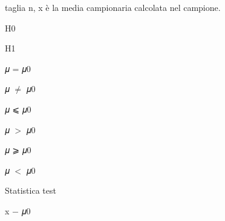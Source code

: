 \documentclass[a4paper,portrait,12pt]{article}
\begin{document}
\begin{flushleft}
taglia n, x \`{e} la media campionaria calcolata nel campione.
\end{flushleft}





\begin{flushleft}
H0
\end{flushleft}





\begin{flushleft}
H1
\end{flushleft}





\begin{flushleft}
𝜇 = 𝜇0
\end{flushleft}





\begin{flushleft}
𝜇 $\neq$ 𝜇0
\end{flushleft}





\begin{flushleft}
𝜇 ⩽ 𝜇0
\end{flushleft}





\begin{flushleft}
𝜇 $>$ 𝜇0
\end{flushleft}





\begin{flushleft}
𝜇 ⩾ 𝜇0
\end{flushleft}





\begin{flushleft}
𝜇 $<$ 𝜇0
\end{flushleft}





\begin{flushleft}
Statistica test
\end{flushleft}


\begin{flushleft}
x $-$ 𝜇0
\end{flushleft}
\end{document}
